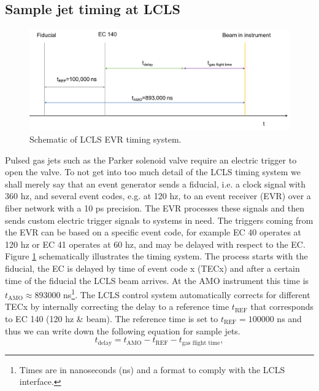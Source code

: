 \subsection{Sample jet timing at LCLS}\label{sec:jet-timing}
\begin{figure}
	\centering
		\includegraphics[width=1.00\textwidth]{images/LCLS-timing-schematic.png}
	\caption{Schematic of LCLS EVR timing system.}
	\label{fig:LCLS-EVR-timing}
\end{figure}
Pulsed gas jets such as the Parker solenoid valve require an electric trigger to open the valve. To not get into too much detail of the LCLS timing system we shall merely say that an event generator sends a fiducial, i.e. a clock signal with 360 hz, and several event codes, e.g. at 120 hz, to an event receiver (EVR) over a fiber network \citep{Krejcik-2007-DIPAC} with a 10 ps precision. The EVR processes these signals and then sends custom electric trigger signals to systems in need. The triggers coming from the EVR can be based on a specific event code, for example EC 40 operates at 120 hz or EC 41 operates at 60 hz, and may be delayed with respect to the EC. Figure \ref{fig:LCLS-EVR-timing} schematically illustrates the timing system. The process starts with the fiducial, the EC is delayed by time of event code x (TECx) and after a certain time of the fiducial the LCLS beam arrives. At the AMO instrument this time is $t_{\text{AMO}}\approx 893000$ ns\footnote{Times are in nanoseconds (ns) and a format to comply with the LCLS interface.}. The LCLS control system automatically corrects for different TECx by internally correcting the delay to a reference time $t_{\text{REF}}$ that corresponds to EC 140 (120 hz \& beam). The reference time is set to $t_{\text{REF}}=100000$ ns and thus we can write down the following equation for sample jets.
\begin{equation}
t_{\text{delay}} = t_{\text{AMO}} - t_{\text{REF}} - t_{\text{gas flight time}},
\label{eqn:sample-jet-delay-time}
\end{equation}
